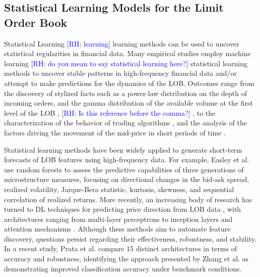 \documentclass[10pt,a4paper,oneside]{article}
\newcommand{\rh}[1]{\textcolor{blue}{\textsf{[RH: #1]}}}
\providecommand{\DIFaddtex}[1]{{\protect\color{blue} \sf #1}} %
\providecommand{\DIFdeltex}[1]{{\protect\color{red} \scriptsize #1}} %
\providecommand{\DIFaddbegin}{} %
\providecommand{\DIFaddend}{} %
\providecommand{\DIFdelbegin}{} %
\providecommand{\DIFdelend}{} %
\providecommand{\DIFadd}[1]{\texorpdfstring{\DIFaddtex{#1}}{#1}} %
\providecommand{\DIFdel}[1]{\texorpdfstring{\DIFdeltex{#1}}{}} %
\newcommand{\DIFscaledelfig}{0.5}
\newlength{\DIFdelgraphicswidth} %
\newlength{\DIFdelgraphicsheight} %
\newcommand{\DIFaddincludegraphics}[2][]{{\color{blue}\fbox{\DIFOincludegraphics[#1]{#2}}}} %
\newcommand{\DIFdelincludegraphics}[2][]{%
\sbox{\DIFdelgraphicsbox}{\DIFOincludegraphics[#1]{#2}}%
\settoboxwidth{\DIFdelgraphicswidth}{\DIFdelgraphicsbox} %
\settoboxtotalheight{\DIFdelgraphicsheight}{\DIFdelgraphicsbox} %
\scalebox{\DIFscaledelfig}{%
\parbox[b]{\DIFdelgraphicswidth}{\usebox{\DIFdelgraphicsbox}\\[-\baselineskip] \rule{\DIFdelgraphicswidth}{0em}}\llap{\resizebox{\DIFdelgraphicswidth}{\DIFdelgraphicsheight}{%
\setlength{\unitlength}{\DIFdelgraphicswidth}%
\begin{picture}(1,1)%
\thicklines\linethickness{2pt} %
{\color[rgb]{1,0,0}\put(0,0){\framebox(1,1){}}}%
{\color[rgb]{1,0,0}\put(0,0){\line( 1,1){1}}}%
{\color[rgb]{1,0,0}\put(0,1){\line(1,-1){1}}}%
\end{picture}%
}\hspace*{3pt}}} %
} %
\DeclareRobustCommand{\DIFaddbegin}{\DIFOaddbegin \let\includegraphics\DIFaddincludegraphics} %
\DeclareRobustCommand{\DIFaddend}{\DIFOaddend \let\includegraphics\DIFOincludegraphics} %
\DeclareRobustCommand{\DIFdelbegin}{\DIFOdelbegin \let\includegraphics\DIFdelincludegraphics} %
\DeclareRobustCommand{\DIFdelend}{\DIFOaddend \let\includegraphics\DIFOincludegraphics} %
\begin{document}
\subsection{Statistical Learning Models for the Limit Order Book}
\label{SubSect:LM}
Statistical \DIFdelbegin \DIFdel{Learning \rh{learning} }\DIFdelend \DIFaddbegin \DIFadd{learning }\DIFaddend methods \cite{hastie2017elements} can be used to uncover statistical regularities in financial data. Many empirical studies employ \DIFdelbegin \DIFdel{machine learning \rh{do you mean to say statistical learning here?} }\DIFdelend \DIFaddbegin \DIFadd{statistical learning }\DIFaddend methods to uncover stable patterns in high-frequency financial data and/or attempt to make predictions for the dynamics of the LOB. Outcomes range from the discovery of stylized facts such as a power-law distribution on the depth of incoming orders, and the gamma distribution of the available volume at the first level of the LOB \DIFdelbegin \DIFdel{, \cite{Bouchaud_2002}\rh{Is this reference before the comma?} }\DIFdelend \DIFaddbegin \DIFadd{\cite{Bouchaud_2002}, }\DIFaddend to the characterization of the behavior of trading algorithms \cite{cartea2023statistical}, and the analysis of the factors driving the movement of the mid-price in short periods of time \cite{cont2013price, cont2023cross, CENESIZOGLU202277}.

Statistical learning methods have been widely applied to generate short-term forecasts of LOB features using high-frequency data. For example, Easley et al. \cite{easley2021microstructure} use random forests to assess the predictive capabilities of three generations of microstructure measures, focusing on directional changes in the bid-ask spread, realized volatility, Jarque-Bera statistic, kurtosis, skewness, and sequential correlation of realized returns. More recently, an increasing body of research has turned to DL techniques for predicting price direction from LOB data \cite{tsantekidis2017using, Zhang_2019, zhang2021deeplearningmarketorder, kolm2023deep, kolm2024improving, briola2024deep, prata2024lob}, with architectures ranging from multi-layer perceptrons \cite{tsantekidis2017using} to inception layers \cite{Zhang_2019} and attention mechanisms \cite{zhang2021deeplearningmarketorder}. Although these methods aim to automate feature discovery, questions persist regarding their effectiveness, robustness, and stability. In a recent study, Prata et al. \cite{prata2024lob} compare 15 distinct architectures in terms of accuracy and robustness, identifying the approach presented by Zhang et al. \cite{zhang2021deeplearningmarketorder} as demonstrating improved classification accuracy under benchmark conditions.
\end{document}
